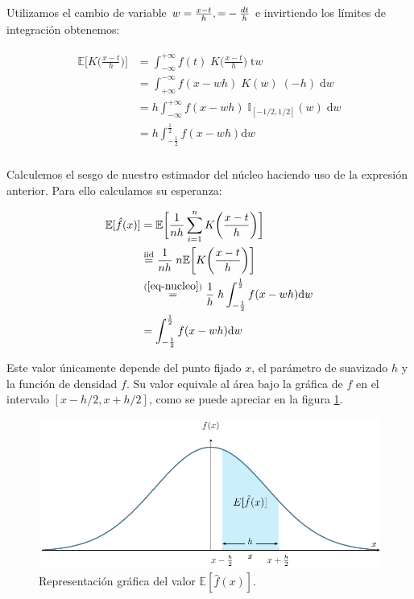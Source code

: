 \documentclass[a4paper]{article}
\newcommand{\E}{\mathbb{E}}
\newcommand{\I}{\mathbb{I}}
\begin{document}
Utilizamos el cambio de variable $w = \frac{x-t}{h}, \text = -\frac{dt}{h}$ e invirtiendo los límites de integración obtenemos:

\begin{align}
	\label{eq-nucleo}
	\begin{split}
		\E \bigg[ K\bigg(\frac{x - t}{h}\bigg) \bigg] & = \int_{-\infty}^{+\infty} f(t) \; K\bigg(\frac{x - t}{h}\bigg) \; \text{t}w \\
		& = \int_{+\infty}^{-\infty} f(x - wh) \; K(w) \; (-h) \; \text{d}w \\
		& = h \int_{-\infty}^{+\infty} f(x - wh) \; \I_{[-1/2,1/2]}(w) \; \text{d}w \\
		& = h \int_{-\frac{1}{2}}^{\frac{1}{2}} f(x - wh) \text{d}w \\
	\end{split}
\end{align}

Calculemos el sesgo de nuestro estimador del núcleo haciendo uso de la expresión anterior. Para ello calculamos su esperanza:

\begin{align*}
	\E [ \hat f(x)] & = \E \bigg[ \frac{1}{nh} \sum_{i=1}^n K\bigg(\frac{x - t}{h}\bigg) \bigg] \\
	& \stackrel{\text{iid}}{=} \frac{1}{nh} \; n \E \bigg[ K\bigg(\frac{x - t}{h}\bigg) \bigg] \\
	& \stackrel{(\ref{eq-nucleo})}{=} \frac{1}{h} \; h \int_{-\frac{1}{2}}^{\frac{1}{2}} f(x - wh) \text{d}w \\
	& = \int_{-\frac{1}{2}}^{\frac{1}{2}} f(x - wh) \text{d}w \\
\end{align*}

Este valor únicamente depende del punto fijado $x$, el parámetro de suavizado $h$ y la función de densidad $f$. Su valor equivale al área bajo la gráfica de $f$ en el intervalo $[x - h/2, x + h/2]$, como se puede apreciar en la figura \ref{fig-sesgo}.

\begin{figure}[H]
	\centering
	\includegraphics[width=17cm]{figures/sesgo}
	\caption{Representación gráfica del valor $\E [\hat f(x)]$.}
	\label{fig-sesgo}
\end{figure}
\end{document}
